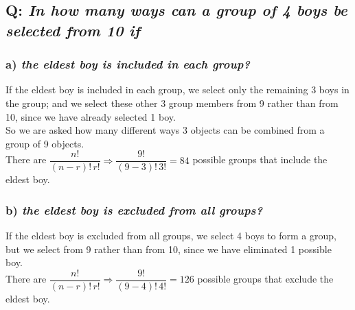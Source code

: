 \documentclass{article}
\begin{document}
%

\subsection*{Q: {\em In how many ways can a group of 4 boys be selected from 10 if}}
\subsubsection*{a) {\em the eldest boy is included in each group?}}
If the eldest boy is included in each group, we select only the remaining 3 boys in the group; and we select these other 3 group members from 9 rather than from 10, since we have already selected 1 boy.\\[1ex]
So we are asked how many different ways 3 objects can be combined from a group of 9 objects.\\[1ex]
There are $\dfrac{n!}{(n-r)!\,r!}\Rightarrow \dfrac{9!}{(9-3)!\,3!}=84$ possible groups that include the eldest boy.

\subsubsection*{b) {\em the eldest boy is excluded from all groups?}}
If the eldest boy is excluded from all groups, we select 4 boys to form a group, but we select from 9 rather than from 10, since we have eliminated 1 possible boy.\\[1ex]
There are $\dfrac{n!}{(n-r)!\,r!}\Rightarrow \dfrac{9!}{(9-4)!\,4!}=126$ possible groups that exclude the eldest boy.
\end{document}
